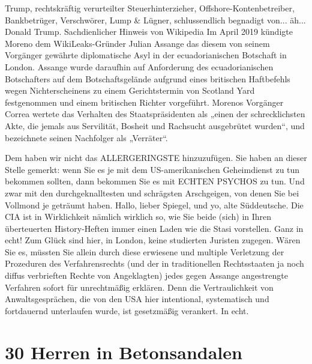 \begin{multicols}{2}
Trump, rechtskräftig verurteilter Steuerhinterzieher,
Offshore-Kontenbetreiber, Bankbetrüger, Verschwörer,
Lump \& Lügner, schlussendlich begnadigt von... äh...
Donald Trump.
Sachdienlicher Hinweis von Wikipedia
Im April 2019 kündigte Moreno dem WikiLeaks-Gründer
Julian Assange das diesem von seinem Vorgänger gewährte diplomatische Asyl in der ecuadorianischen Botschaft
in London. Assange wurde daraufhin auf Anforderung
des ecuadorianischen Botschafters auf dem Botschaftsgelände aufgrund eines britischen Haftbefehls wegen
Nichterscheinens zu einem Gerichtstermin von Scotland
Yard festgenommen und einem britischen Richter vorgeführt. Morenos Vorgänger Correa wertete das Verhalten
des Staatspräsidenten als „einen der schrecklichsten Akte,
die jemals aus Servilität, Bosheit und Rachsucht ausgebrütet wurden“, und bezeichnete seinen Nachfolger als
„Verräter“.

Dem haben wir nicht das ALLERGERINGSTE hinzuzufügen.
Sie haben an dieser Stelle gemerkt: wenn Sie es je mit
dem US-amerikanischen Geheimdienst zu tun bekommen sollten, dann bekommen Sie es mit ECHTEN PSYCHOS zu tun. Und zwar mit den durchgeknalltesten und
schrägsten Arschgeigen, von denen Sie bei Vollmond je
geträumt haben. Hallo, lieber Spiegel, und yo, alte Süddeutsche. Die CIA ist in Wirklichkeit nämlich wirklich so,
wie Sie beide (sich) in Ihren überteuerten History-Heften immer einen Laden wie die Stasi vorstellen. Ganz in
echt!
Zum Glück sind hier, in London, keine studierten Juristen zugegen. Wären Sie es, müssten Sie allein durch
diese erwiesene und multiple Verletzung der Prozeduren
des Verfahrensrechts (und der in traditionellen Rechtsstaaten ja noch diffus verbrieften Rechte von Angeklagten) jedes gegen Assange angestrengte Verfahren sofort
für unrechtmäßig erklären. Denn die Vertraulichkeit von
Anwaltsgesprächen, die von den USA hier intentional,
systematisch und fortdauernd unterlaufen wurde, ist
gesetzmäßig verankert. In echt.



\chapter{30 Herren in Betonsandalen} %


\end{multicols}
